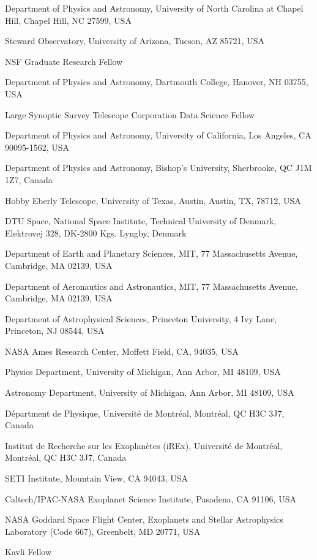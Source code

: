 \documentclass{nature3}
\begin{document}
\begin{affiliations}
\item Department of Physics and Astronomy, University of North Carolina at Chapel Hill, Chapel Hill, NC 27599, USA
\item Steward Observatory, University of Arizona, Tucson, AZ 85721, USA
\item NSF Graduate Research Fellow
\item Department of Physics and Astronomy, Dartmouth College, Hanover, NH 03755, USA
\item Large Synoptic Survey Telescope Corporation Data Science Fellow
\item Department of Physics and Astronomy, University of California, Los Angeles, CA 90095-1562, USA
\item Department of Physics and Astronomy, Bishop’s University, Sherbrooke, QC J1M 1Z7, Canada
\item Hobby Eberly Telescope, University of Texas, Austin, Austin, TX, 78712, USA
\item DTU Space, National Space Institute, Technical University of Denmark, Elektrovej 328, DK-2800 Kgs. Lyngby, Denmark
\item Department of Earth and Planetary Sciences, MIT, 77 Massachusetts Avenue, Cambridge, MA 02139, USA
\item Department of Aeronautics and Astronautics, MIT, 77 Massachusetts Avenue, Cambridge, MA 02139, USA
\item Department of Astrophysical Sciences, Princeton University, 4 Ivy Lane, Princeton, NJ 08544, USA
\item NASA Ames Research Center, Moffett Field, CA, 94035, USA
\item Physics Department, University of Michigan, Ann Arbor, MI 48109, USA
\item Astronomy Department, University of Michigan, Ann Arbor, MI 48109, USA
\item D\'epartment de Physique, Universit\'e de Montr\'eal, Montr\'eal, QC H3C 3J7, Canada
\item Institut de Recherche sur les Exoplan\`etes (iREx), Universit\'e de Montr\'eal, Montr\'eal, QC H3C 3J7, Canada
\item SETI Institute, Mountain View, CA 94043, USA
\item Caltech/IPAC-NASA Exoplanet Science Institute, Pasadena, CA 91106, USA
\item NASA Goddard Space Flight Center, Exoplanets and Stellar Astrophysics Laboratory (Code 667), Greenbelt, MD 20771, USA
\item Kavli Fellow

\end{affiliations}
\end{document}
